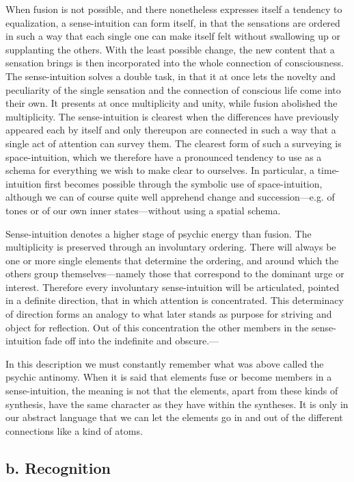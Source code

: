 \documentclass[12pt,a4paper]{book}
\newcommand{\opage}[1]{\marginnote{\footnotesize\textit{[#1]}}}
\begin{document}
When fusion is not possible, and there nonetheless expresses itself a
tendency to equalization, a sense-intuition can form itself, in that the
sensations are ordered in such a way that each single one can make itself
felt without swallowing up or supplanting the others. With the least
possible change, the new content that a sensation brings is then
incorporated into the \opage{46}whole connection of consciousness. The
sense-intuition solves a double task, in that it at once lets the novelty
and peculiarity of the single sensation and the connection of conscious
life come into their own. It presents at once multiplicity and unity,
while fusion abolished the multiplicity. The sense-intuition is clearest
when the differences have previously appeared each by itself and only
thereupon are connected in such a way that a single act of attention can
survey them. The clearest form of such a surveying is space-intuition,
which we therefore have a pronounced tendency to use as a schema for
everything we wish to make clear to ourselves. In particular, a
time-intuition first becomes possible through the symbolic use of
space-intuition, although we can of course quite well apprehend change
and succession---e.g. of tones or of our own inner states---without using
a spatial schema.

Sense-intuition denotes a higher stage of psychic energy than fusion. The
multiplicity is preserved through an involuntary ordering. There will
always be one or more single elements that determine the ordering, and
around which the others group themselves---namely those that correspond
to the dominant urge or interest. Therefore every involuntary
sense-intuition will be articulated, pointed in a definite direction,
that in which attention is concentrated. This determinacy of direction
forms an analogy to what later stands as purpose for striving and object
for reflection. Out of this concentration the other members in the
sense-intuition fade off into the indefinite and obscure.---

In this description we must constantly remember what was above called the
psychic antinomy. When it is said that elements fuse or become members in
a sense-intuition, the meaning is not that the elements, apart from these
kinds of synthesis, have the same character as they have within the
syntheses. It is only in our abstract language that we can let the
elements go in and out of the different connections like a kind of atoms.

\subsection*{b. Recognition}
\label{ssec:genkendelse}
\end{document}
